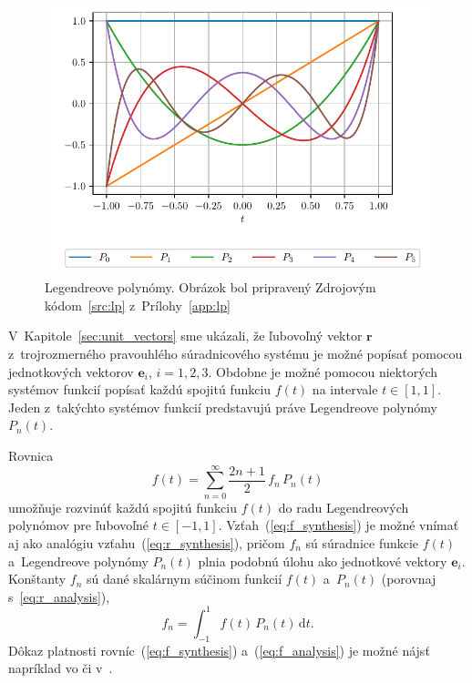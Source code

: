 \documentclass[a4paper, 12pt]{book}
\newcommand{\diff}{\mathrm d}
\let\vec\mathbf
\begin{document}
\begin{figure}[bt]
\label{fig:lp}
\centering
\includegraphics{./fig-legendre-polynomials.pdf}
\caption{Legendreove polynómy.  Obrázok bol pripravený Zdrojovým 
kódom~\ref{src:lp} z~Prílohy~\ref{app:lp}}
\end{figure}

V~Kapitole~\ref{sec:unit_vectors} sme ukázali, že ľubovoľný vektor $\vec r$ 
z~trojrozmerného pravouhlého súradnicového systému je možné popísať pomocou 
jednotkových vektorov $\vec e_i$, $i = 1, 2, 3$.  Obdobne je možné pomocou 
niektorých systémov funkcií popísať každú spojitú funkciu $f(t)$ na intervale 
$t \in [1, 1]$.  Jeden z~takýchto systémov funkcií predstavujú práve 
Legendreove polynómy~$P_n(t)$.

Rovnica
%
\begin{equation}
\label{eq:f_synthesis}
f(t) = \sum_{n = 0}^\infty \frac{2n + 1}{2} \, f_n \, P_n(t)
\end{equation}
%
umožňuje rozvinúť každú spojitú funkciu $f(t)$ do radu Legendreových polynómov 
pre ľubovoľné $t \in [-1, 1]$.  Vzťah~(\ref{eq:f_synthesis}) je možné vnímať aj 
ako analógiu vzťahu~(\ref{eq:r_synthesis}), pričom $f_n$ sú súradnice funkcie 
$f(t)$ a~Legendreove polynómy $P_n(t)$ plnia podobnú úlohu ako jednotkové 
vektory $\vec e_i$.  Konštanty $f_n$ sú dané skalárnym súčinom funkcií $f(t)$ 
a~$P_n(t)$ (porovnaj s~\ref{eq:r_analysis}),
%
\begin{equation}
\label{eq:f_analysis}
f_n = \int_{-1}^1 f(t) \, P_n(t) \, \diff t{.}
\end{equation}
%
Dôkaz platnosti rovníc~(\ref{eq:f_synthesis}) a~(\ref{eq:f_analysis}) je možné 
nájsť napríklad vo \cite{Freeden2009} či v~\cite{SansoGeoidDetermination}.
\end{document}
